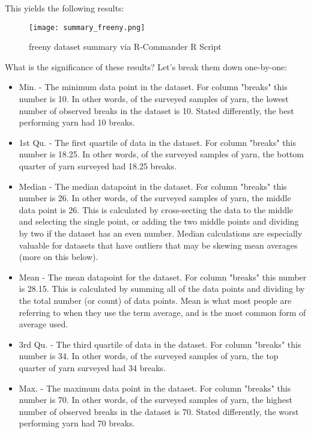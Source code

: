 This yields the following results:

\begin{figure}[h!]
\texttt{[image: summary\_freeny.png]}
 \caption{freeny dataset summary via R-Commander R Script}
 \label{fig:summary_freeny}
\end{figure}

What is the significance of these results? Let's break them down one-by-one:


\begin{itemize}
 \item Min. - The minimum data point in the dataset. For column "breaks" this number is 10. In other words, of the surveyed samples of yarn, the lowest number of observed breaks in the dataset is 10. Stated differently, the best performing yarn had 10 breaks.
 \item 1st Qu. - The first quartile of data in the dataset. For column "breaks" this number is 18.25. In other words, of the surveyed samples of yarn, the bottom quarter of yarn surveyed had 18.25 breaks.
 \item Median - The median datapoint in the dataset. For column "breaks" this number is 26. In other words, of the surveyed samples of yarn, the middle data point is 26. This is calculated by cross-secting the data to the middle and selecting the single point, or adding the two middle points and dividing by two if the dataset has an even number. Median calculations are especially valuable for datasets that have outliers that may be skewing mean averages (more on this below).
 \item Mean - The mean datapoint for the dataset. For column "breaks" this number is 28.15. This is calculated by summing all of the data points and dividing by the total number (or count) of data points. Mean is what most people are referring to when they use the term average, and is the most common form of average used.
 \item 3rd Qu. - The third quartile of data in the dataset. For column "breaks" this number is 34. In other words, of the surveyed samples of yarn, the top quarter of yarn surveyed had 34 breaks.
 \item Max. - The maximum data point in the dataset. For column "breaks" this number is 70. In other words, of the surveyed samples of yarn, the highest number of observed breaks in the dataset is 70. Stated differently, the worst performing yarn had 70 breaks.
\end{itemize}

